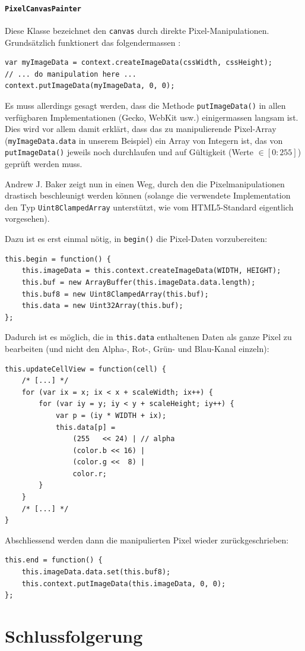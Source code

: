 \documentclass[11pt]{article} %
\theoremstyle{definition}
\begin{document}
\subsection{{\tt PixelCanvasPainter}}

Diese Klasse bezeichnet den {\tt canvas} durch direkte Pixel-Manipulationen. Grundsätzlich funktionert das folgendermassen \cite{mdn:PixelCanvasDoku}:

\begin{lstlisting}
var myImageData = context.createImageData(cssWidth, cssHeight);
// ... do manipulation here ...
context.putImageData(myImageData, 0, 0);
\end{lstlisting}

Es muss allerdings gesagt werden, dass die Methode {\tt putImageData()} in allen verfügbaren Implementationen (Gecko, WebKit usw.) einigermassen langsam ist. Dies wird vor allem damit erklärt, dass das zu manipulierende Pixel-Array ({\tt myImageData.data} in unserem Beispiel) ein Array von Integern ist, das von {\tt putImageData()} jeweils noch durchlaufen und auf Gültigkeit (Werte $\in [0: 255]$) geprüft werden muss.

Andrew J. Baker zeigt nun in \cite{mdn:PixelCanvas} einen Weg, durch den die Pixelmanipulationen drastisch beschleunigt werden können (solange die verwendete Implementation den Typ {\tt Uint8ClampedArray} unterstützt, wie vom HTML5-Standard  \cite{wthree:twodcanvas} eigentlich vorgesehen).

Dazu ist es erst einmal nötig, in {\tt begin()} die Pixel-Daten vorzubereiten:

\begin{lstlisting}
this.begin = function() {
	this.imageData = this.context.createImageData(WIDTH, HEIGHT);
	this.buf = new ArrayBuffer(this.imageData.data.length);
	this.buf8 = new Uint8ClampedArray(this.buf);
	this.data = new Uint32Array(this.buf);
};
\end{lstlisting}

Dadurch ist es möglich, die in {\tt this.data} enthaltenen Daten als ganze Pixel zu bearbeiten (und nicht den Alpha-, Rot-, Grün- und Blau-Kanal einzeln):

\begin{lstlisting}
this.updateCellView = function(cell) {
	/* [...] */
	for (var ix = x; ix < x + scaleWidth; ix++) {
		for (var iy = y; iy < y + scaleHeight; iy++) {
			var p = (iy * WIDTH + ix);		
			this.data[p] =
				(255   << 24) | // alpha
				(color.b << 16) |
				(color.g <<  8) |
				color.r;
		}
	}
	/* [...] */
}
\end{lstlisting}

Abschliessend werden dann die manipulierten Pixel wieder zurückgeschrieben:

\begin{lstlisting}
this.end = function() {
	this.imageData.data.set(this.buf8);
	this.context.putImageData(this.imageData, 0, 0);
};
\end{lstlisting}

\part{Schlussfolgerung}



\end{document}
